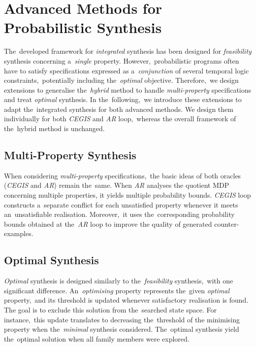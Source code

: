 \chapter{Advanced Methods for Probabilistic Synthesis}\label{chap:advanced}
The~developed framework for \textit{integrated} synthesis has been designed for \textit{feasibility} synthesis concerning a~\textit{single} property.
However,~probabilistic programs often have to satisfy specifications expressed as a~\textit{conjunction} of several temporal logic constraints,~potentially including the~\textit{optimal} objective.
Therefore,~we design extensions to generalise the~\textit{hybrid} method to handle \textit{multi-property} specifications and treat \textit{optimal} synthesis.
In the~following,~we introduce these extensions to adapt the~integrated synthesis for both advanced methods. 
We design them individually for both \emph{CEGIS} and \emph{AR} loop,~whereas the overall framework of the~hybrid method is unchanged.

\section{Multi-Property Synthesis}
When considering \textit{multi-property} specifications,~the basic ideas of both oracles (\textit{CEGIS} and \textit{AR}) remain the~same.
When \textit{AR} analyses the quotient MDP concerning multiple properties, it yields multiple probability bounds.
\textit{CEGIS} loop constructs a~separate conflict for each unsatisfied property whenever it meets an~unsatisfiable realisation.
Moreover,~it uses the~corresponding probability bounds obtained at the~\textit{AR} loop to improve the quality of generated counter-examples.

\section{Optimal Synthesis}
\textit{Optimal} synthesis is designed similarly to the~\textit{feasibility} synthesis,~with one significant difference.
An~\textit{optimising} property represents the~given \textit{optimal} property,~and its threshold is updated whenever satisfactory realisation is found.
The goal is to exclude this solution from the~searched state space.
For instance,~this update translates to decreasing the~threshold of the minimising property when the~\textit{minimal} synthesis considered.
The~optimal synthesis yield the~optimal solution when all family members were explored.

